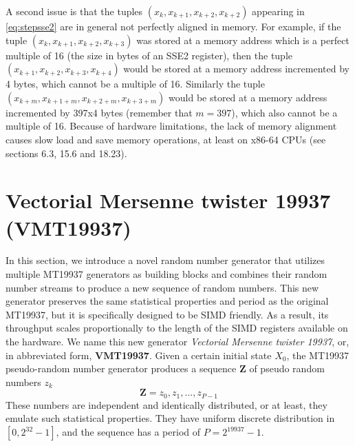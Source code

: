 \documentclass[preprint,1p,times]{elsarticle}
\begin{document}
A second issue is that the tuples $(x_k, x_{k+1}, x_{k+2}, x_{k+2})$ appearing in \eqref{eq:stepsse2} are in general not perfectly aligned in memory. For example, if the tuple $(x_k, x_{k+1}, x_{k+2}, x_{k+3})$ was stored at a memory address which is a perfect multiple of 16 (the size in bytes of an SSE2 register), then the tuple $(x_{k+1}, x_{k+2}, x_{k+3}, x_{k+4})$ would be stored at a memory address incremented by 4 bytes, which cannot be a multiple of 16. Similarly the tuple $(x_{k+m}, x_{k+1+m}, x_{k+2+m}, x_{k+3+m})$ would be stored at a memory address incremented by 397x4 bytes (remember that $m=397$), which also cannot  be a multiple of 16. Because of hardware limitations, the lack of memory alignment causes slow load and save memory operations, at least on x86-64 CPUs (see \cite{intel} sections 6.3, 15.6 and 18.23).

\section{Vectorial Mersenne twister 19937 (VMT19937)}
\label{sec:simdgen}
\noindent In this section, we introduce a novel random number generator that utilizes multiple MT19937 generators as building blocks and combines their random number streams to produce a new sequence of random numbers. This new generator preserves the same statistical properties and period as the original MT19937, but it is specifically designed to be SIMD friendly. As a result, its throughput scales proportionally to the length of the SIMD registers available on the hardware. We name this new generator \textit{Vectorial Mersenne twister 19937}, or, in abbreviated form, \textbf{VMT19937}.
Given a certain initial state $X_0$, the MT19937 pseudo-random number generator produces a sequence $\boldsymbol{Z}$ of pseudo random numbers $z_k$
\begin{equation}
\label{eq:mainseq}
   \boldsymbol{Z} = z_0, z_1, \dots, z_{P-1} 
\end{equation}
These numbers are independent and identically distributed, or at least, they emulate such statistical properties. They have uniform discrete distribution in $[0, 2^{32}-1]$, and the sequence has a period of $P=2^{19937}-1$.
\end{document}

